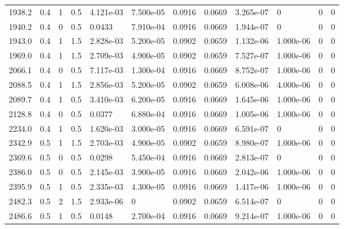 \documentclass[preview]{standalone}
\begin{document}
{{\begin{tabular}{L{1.2cm}C{1.2cm} C{0.3cm}C{0.5cm} C{1.4cm}C{1.4cm} C{1.4cm}C{1.4cm} C{1.6cm}C{1.6cm} C{1.6cm}C{1.6cm}}
  1938.2  &   0.4  & 1     & 0.5 &  4.121e-03  & 7.500e-05  &  0.0916&   0.0669& 3.265e-07 & 0   &  0 & 0  \\ 
  1940.2  &   0.4  & 0     & 0.5 &  0.0433  & 7.910e-04  &  0.0916&   0.0669& 1.944e-07 & 0   &  0 & 0  \\ 
  1943.0  &   0.4  & 1     & 1.5 &  2.828e-03  & 5.200e-05  &  0.0902&   0.0659& 1.132e-06 & 1.000e-06   &  0 & 0  \\ 
  1969.0  &   0.4  & 1     & 1.5 &  2.709e-03  & 4.900e-05  &  0.0902&   0.0659& 7.527e-07 & 1.000e-06   &  0 & 0  \\ 
  2066.1  &   0.4  & 0     & 0.5 &  7.117e-03  & 1.300e-04  &  0.0916&   0.0669& 8.752e-07 & 1.000e-06   &  0 & 0  \\ 
  2088.5  &   0.4  & 1     & 1.5 &  2.856e-03  & 5.200e-05  &  0.0902&   0.0659& 6.008e-06 & 4.000e-06   &  0 & 0  \\ 
  2089.7  &   0.4  & 1     & 0.5 &  3.410e-03  & 6.200e-05  &  0.0916&   0.0669& 1.645e-06 & 1.000e-06   &  0 & 0  \\ 
  2128.8  &   0.4  & 0     & 0.5 &  0.0377  & 6.880e-04  &  0.0916&   0.0669& 1.005e-06 & 1.000e-06   &  0 & 0  \\ 
  2234.0  &   0.4  & 1     & 0.5 &  1.620e-03  & 3.000e-05  &  0.0916&   0.0669& 6.591e-07 & 0   &  0 & 0  \\ 
  2342.9  &   0.5  & 1     & 1.5 &  2.703e-03  & 4.900e-05  &  0.0902&   0.0659& 8.980e-07 & 1.000e-06   &  0 & 0  \\ 
  2369.6  &   0.5  & 0     & 0.5 &  0.0298  & 5.450e-04  &  0.0916&   0.0669& 2.813e-07 & 0   &  0 & 0  \\ 
  2386.0  &   0.5  & 0     & 0.5 &  2.145e-03  & 3.900e-05  &  0.0916&   0.0669& 2.042e-06 & 1.000e-06   &  0 & 0  \\ 
  2395.9  &   0.5  & 1     & 0.5 &  2.335e-03  & 4.300e-05  &  0.0916&   0.0669& 1.417e-06 & 1.000e-06   &  0 & 0  \\ 
  2482.3  &   0.5  & 2     & 1.5 &  2.933e-06  & 0  &  0.0902&   0.0659& 6.514e-07 & 0   &  0 & 0  \\ 
  2486.6  &   0.5  & 1     & 0.5 &  0.0148  & 2.700e-04  &  0.0916&   0.0669& 9.214e-07 & 1.000e-06   &  0 & 0  \\ 
\hline 
\end{tabular} 

}}
\end{document}
